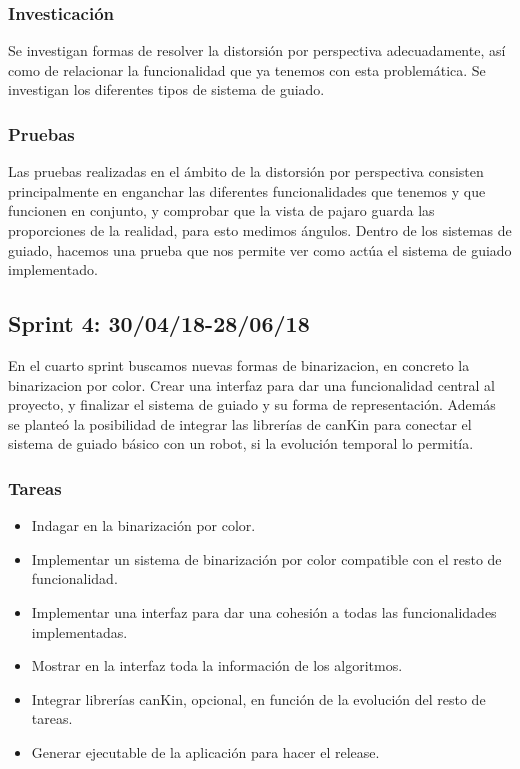 \subsubsection{Investicación}
Se investigan formas de resolver la distorsión por perspectiva adecuadamente, así como de relacionar la funcionalidad que ya tenemos con esta problemática.
Se investigan los diferentes tipos de sistema de guiado.
\subsubsection{Pruebas}
Las pruebas realizadas en el ámbito de la distorsión por perspectiva consisten principalmente en enganchar las diferentes funcionalidades que tenemos y que funcionen en conjunto, y comprobar que la vista de pajaro guarda las proporciones de la realidad, para esto medimos ángulos.
Dentro de los sistemas de guiado, hacemos una prueba que nos permite ver como actúa el sistema de guiado implementado.


\subsection{Sprint 4: 30/04/18-28/06/18}
En el cuarto sprint buscamos nuevas formas de binarizacion, en concreto la binarizacion por color. Crear una interfaz para dar una funcionalidad central al proyecto, y finalizar el sistema de guiado y su forma de representación. Además se planteó la posibilidad de integrar las librerías de canKin para conectar el sistema de guiado básico con un robot, si la evolución temporal lo permitía.

\subsubsection{Tareas}
\begin{itemize}
	\item Indagar en la binarización por color.
	
	\item Implementar un sistema de binarización por color compatible con el resto de funcionalidad.
	
	\item Implementar una interfaz para dar una cohesión a todas las funcionalidades implementadas.
	
	\item Mostrar en la interfaz toda la información de los algoritmos.
	
	\item Integrar librerías canKin, opcional, en función de la evolución del resto de tareas.
	
	\item Generar ejecutable de la aplicación para hacer el release\cite{release}.

\end{itemize}

